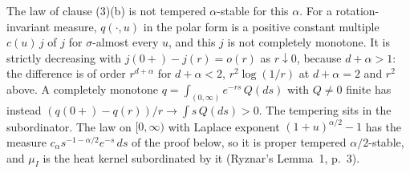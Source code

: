 The law of clause (3)(b) is not tempered $\alpha$-stable for this $\alpha$. For a rotation-invariant \Levy{}
measure, $q(\cdot,u)$ in the polar form is a positive constant multiple $c(u)\,j$ of $j$ for
$\sigma$-almost every $u$, and this $j$ is not completely monotone. It is strictly decreasing with
$j(0{+}) - j(r) = o(r)$ as $r \downarrow 0$, because $d + \alpha > 1$: the difference is of order
$r^{d+\alpha}$ for $d + \alpha < 2$, $r^2\log(1/r)$ at $d + \alpha = 2$ and $r^2$ above. A completely monotone $q = \int_{(0,\infty)} e^{-rs}\,Q(ds)$
with $Q \ne 0$ finite has instead $(q(0{+}) - q(r))/r \to \int s\,Q(ds) > 0$. The tempering sits in the
subordinator. The law on $[0,\infty)$ with Laplace exponent $(1 + u)^{\alpha/2} - 1$ has the \Levy{}
measure $c_\alpha s^{-1-\alpha/2}e^{-s}\,ds$ of the proof below, so it is proper tempered
$\alpha/2$-stable, and $\mu_I$ is the heat kernel subordinated by it (Ryznar's Lemma~1, p.~3).

